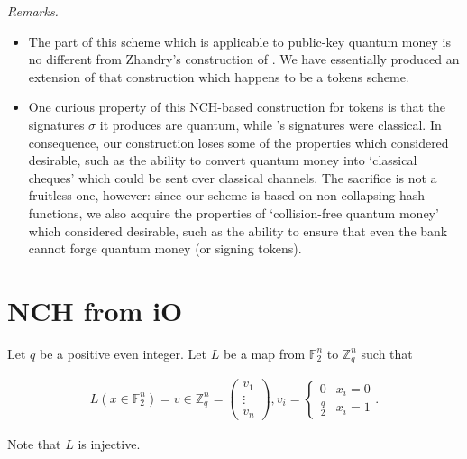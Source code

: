 \documentclass{article}
\begin{document}
\noindent \textit{Remarks.}
\begin{itemize}
    \item The part of this scheme which is applicable to public-key quantum money is no different from Zhandry's construction of \cite{zha17}. We have essentially produced an extension of that construction which happens to be a tokens scheme.
    \item One curious property of this NCH-based construction for tokens is that the signatures $\sigma$ it produces are quantum, while \cite{tokens}'s signatures were classical. In consequence, our construction loses some of the properties which \cite{tokens} considered desirable, such as the ability to convert quantum money into `classical cheques' which could be sent over classical channels. The sacrifice is not a fruitless one, however: since our scheme is based on non-collapsing hash functions, we also acquire the properties of `collision-free quantum money' which \cite{zha17} considered desirable, such as the ability to ensure that even the bank cannot forge quantum money (or signing tokens).
\end{itemize}

\section{NCH from iO}

Let $q$ be a positive even integer. Let $L$ be a map from $\mathbb{F}_2^n$ to $\mathbb{Z}_q^n$ such that

\begin{align}
	L(x \in \mathbb{F}_2^n) = v \in \mathbb{Z}_q^n = \begin{pmatrix} v_1 \\ \vdots \\ v_n \end{pmatrix},
	v_i =
	\begin{cases}
		0 & x_i = 0 \\
		\frac{q}{2} & x_i = 1
	\end{cases}.
\end{align}

Note that $L$ is injective.
\end{document}
